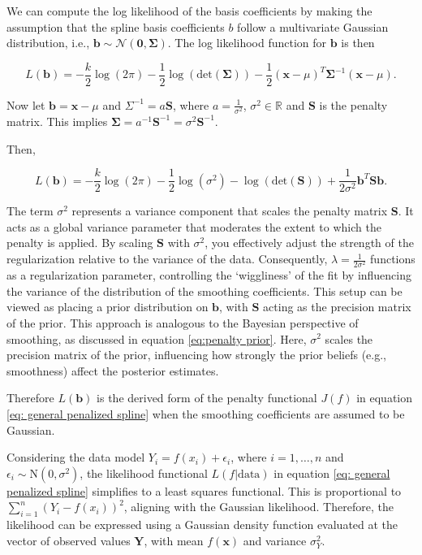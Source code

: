 \documentclass[
11pt, %
oneside, %
english, %
singlespacing, %
]{macthesis} %
\begin{document}
We can compute the log likelihood of the basis coefficients by making the assumption that
the spline basis coefficients \(b\) follow a multivariate Gaussian distribution, i.e., \(\mathbf{b} \sim \mathcal{N}(\mathbf{0}, \mathbf{\Sigma})\). The log likelihood function for \(\mathbf{b}\) is then

\[
L(\mathbf{b}) = -\frac{k}{2} \log(2\pi) -\frac{1}{2} \log(\text{det}(\mathbf{\Sigma})) -\frac{1}{2} (\mathbf{x}-\mu)^T \mathbf{\Sigma}^{-1} (\mathbf{x}-\mu).
\]

Now let \(\mathbf{b} = \mathbf{x}- \mu\) and \(\Sigma^{-1}= a\mathbf{S}\), where \(a = \frac{1}{\sigma^2}\), \(\sigma^2 \in \mathbb{R}\) and \(\mathbf{S}\) is the penalty matrix. This implies \(\mathbf{\Sigma} = a^{-1}\mathbf{S}^{-1}= \sigma^2\mathbf{S}^{-1}\).

Then,

\begin{equation}
L(\mathbf{b}) = -\frac{k}{2} \log(2\pi) - \frac{1}{2} \log(\sigma^2) -  \log(\text{det}(\mathbf{S})) + \frac{1}{2\sigma^2} \mathbf{b}^T \mathbf{S} \mathbf{b}.
\label{eq:obj eqn}
\end{equation}

The term \(\sigma^2\) represents a variance component that scales the penalty matrix \(\mathbf{S}\). It acts as a global variance parameter that moderates the extent to which the penalty is applied. By scaling \(\mathbf{S}\) with \(\sigma^2\), you effectively adjust the strength of the regularization relative to the variance of the data. Consequently, \(\lambda = \frac{1}{2\sigma^2}\) functions as a regularization parameter, controlling the `wiggliness' of the fit by influencing the variance of the distribution of the smoothing coefficients. This setup can be viewed as placing a prior distribution on \(\mathbf{b}\), with \(\mathbf{S}\) acting as the precision matrix of the prior. This approach is analogous to the Bayesian perspective of smoothing, as discussed in equation \ref{eq:penalty prior}. Here, \(\sigma^2\) scales the precision matrix of the prior, influencing how strongly the prior beliefs (e.g., smoothness) affect the posterior estimates.

Therefore \(L(\mathbf{b})\) is the derived form of the penalty functional \(J(f)\) in equation \ref{eq: general penalized spline} when the smoothing coefficients are assumed to be Gaussian.

Considering the data model \(Y_i = f(x_i) + \epsilon_i\), where \(i = 1, \dots, n\) and \(\epsilon_i \sim \text{N}(0, \sigma^2)\), the likelihood functional \(L(f|\text{data})\) in equation \ref{eq: general penalized spline} simplifies to a least squares functional. This is proportional to \(\sum_{i=1}^n (Y_i - f(x_i))^2\), aligning with the Gaussian likelihood. Therefore, the likelihood can be expressed using a Gaussian density function evaluated at the vector of observed values \(\mathbf{Y}\), with mean \(f(\mathbf{x})\) and variance \(\sigma^2_Y\).
\end{document}
